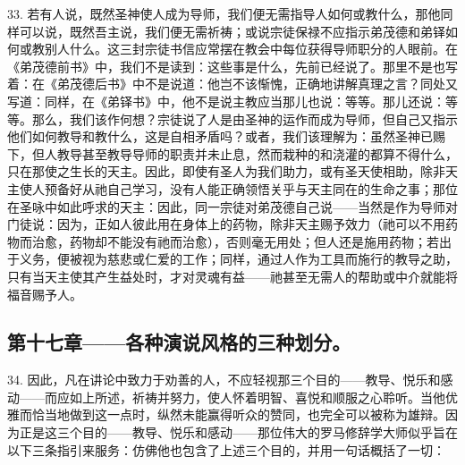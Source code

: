 33. 若有人说，既然圣神使人成为导师，我们便无需指导人如何或教什么，那他同样可以说，既然吾主说，我们便无需祈祷；或说宗徒保禄不应指示弟茂德和弟铎如何或教别人什么。这三封宗徒书信应常摆在教会中每位获得导师职分的人眼前。在《弟茂德前书》中，我们不是读到：这些事是什么，先前已经说了。那里不是也写着：在《弟茂德后书》中不是说道：他岂不该惭愧，正确地讲解真理之言？同处又写道：同样，在《弟铎书》中，他不是说主教应当那儿也说：等等。那儿还说：等等。那么，我们该作何想？宗徒说了人是由圣神的运作而成为导师，但自己又指示他们如何教导和教什么，这是自相矛盾吗？或者，我们该理解为：虽然圣神已赐下，但人教导甚至教导导师的职责并未止息，然而栽种的和浇灌的都算不得什么，只在那使之生长的天主。因此，即使有圣人为我们助力，或有圣天使相助，除非天主使人预备好从祂自己学习，没有人能正确领悟关乎与天主同在的生命之事；那位在圣咏中如此呼求的天主：因此，同一宗徒对弟茂德自己说——当然是作为导师对门徒说：因为，正如人彼此用在身体上的药物，除非天主赐予效力（祂可以不用药物而治愈，药物却不能没有祂而治愈），否则毫无用处；但人还是施用药物；若出于义务，便被视为慈悲或仁爱的工作；同样，通过人作为工具而施行的教导之助，只有当天主使其产生益处时，才对灵魂有益——祂甚至无需人的帮助或中介就能将福音赐予人。\par


\subsection{第十七章——各种演说风格的三种划分。}

34. 因此，凡在讲论中致力于劝善的人，不应轻视那三个目的——教导、悦乐和感动——而应如上所述，祈祷并努力，使人怀着明智、喜悦和顺服之心聆听。当他优雅而恰当地做到这一点时，纵然未能赢得听众的赞同，也完全可以被称为雄辩。因为正是这三个目的——教导、悦乐和感动——那位伟大的罗马修辞学大师似乎旨在以下三条指引来服务：仿佛他也包含了上述三个目的，并用一句话概括了一切：\par

